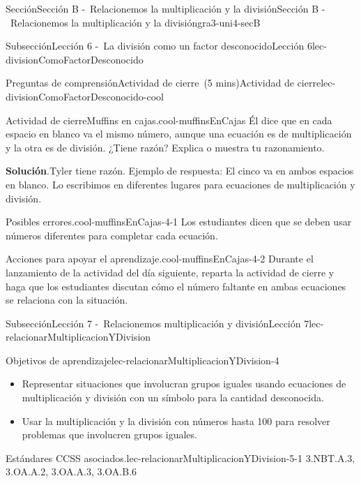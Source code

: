 \documentclass[oneside,10pt,]{article}
\newcommand{\blocktitlefont}{\relax}
\begin{document}
\begin{sectionptx}{Sección}{Sección B -~Relacionemos la multiplicación y la división}{}{Sección B -~Relacionemos la multiplicación y la división}{}{}{gra3-uni4-secB}
\begin{subsectionptx}{Subsección}{Lección 6 -~La división como un factor desconocido}{}{Lección 6}{}{}{lec-divisionComoFactorDesconocido}
\begin{reading-questions-subsubsection}{Preguntas de comprensión}{Actividad de cierre~(5 mins)}{}{Actividad de cierre}{}{}{lec-divisionComoFactorDesconocido-cool}
\begin{project}{Actividad de cierre}{Muffins en cajas.}{cool-muffinsEnCajas}
Él dice que en cada espacio en blanco va el mismo número, aunque una ecuación es de multiplicación y la otra es de división. ¿Tiene razón? Explica o muestra tu razonamiento.%
\par\smallskip%
\noindent\textbf{\blocktitlefont Solución}.\hypertarget{cool-muffinsEnCajas-3}{}\quad{}Tyler tiene razón. Ejemplo de respuesta: El cinco va en ambos espacios en blanco. Lo escribimos en diferentes lugares para ecuaciones de multiplicación y división.%
\end{project}%
\par
\begin{paragraphs}{Posibles errores.}{cool-muffinsEnCajas-4-1}%
Los estudiantes dicen que se deben usar números diferentes para completar cada ecuación.%
\end{paragraphs}%
\begin{paragraphs}{Acciones para apoyar el aprendizaje.}{cool-muffinsEnCajas-4-2}%
Durante el lanzamiento de la actividad del día siguiente, reparta la actividad de cierre y haga que los estudiantes discutan cómo el número faltante en ambas ecuaciones se relaciona con la situación.%
\end{paragraphs}%
\end{reading-questions-subsubsection}
\end{subsectionptx}
%
%
\typeout{************************************************}
\typeout{************************************************}
%
\begin{subsectionptx}{Subsección}{Lección 7 -~Relacionemos multiplicación y división}{}{Lección 7}{}{}{lec-relacionarMultiplicacionYDivision}
\begin{objectives}{Objetivos de aprendizaje}{lec-relacionarMultiplicacionYDivision-4}
%
\begin{itemize}[label=\textbullet]
\item{}Representar situaciones que involucran grupos iguales usando ecuaciones de multiplicación y división con un símbolo para la cantidad desconocida.%
\item{}Usar la multiplicación y la división con números hasta 100 para resolver problemas que involucren grupos iguales.%
\end{itemize}
\end{objectives}
\begin{introduction}{}%
\begin{paragraphs}{Estándares CCSS asociados.}{lec-relacionarMultiplicacionYDivision-5-1}%
3.NBT.A.3, 3.OA.A.2, 3.OA.A.3, 3.OA.B.6%

\end{paragraphs}
\end{introduction}
\end{subsectionptx}
\end{sectionptx}
\end{document}
